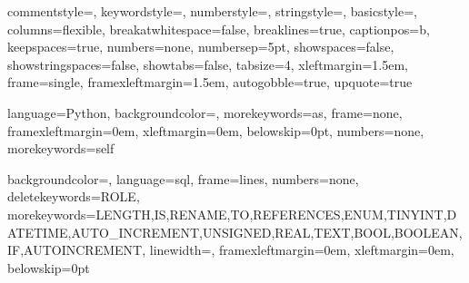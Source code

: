 { %
	commentstyle=\color{Blue},
	keywordstyle=\color{Green},
	numberstyle=\tiny\color{Gray},
	stringstyle=\color{Fuchsia},
	basicstyle=\ttfamily,
	columns=flexible,
	breakatwhitespace=false,
	breaklines=true,
	captionpos=b,
	keepspaces=true,
	numbers=none,
	numbersep=5pt,
	showspaces=false,
	showstringspaces=false,
	showtabs=false,
	tabsize=4,
	xleftmargin=1.5em,
	frame=single,
	framexleftmargin=1.5em,
	autogobble=true,
	upquote=true %
} %
\lstset{style=BaselineStyle}

{ %
	language=Python,
	backgroundcolor=\color{Goldenrod!5},
	morekeywords={as},
	frame=none,
	framexleftmargin=0em,
	xleftmargin=0em,
	belowskip=0pt,
	numbers=none,
	morekeywords={self}
} %

{ %
	backgroundcolor=\color{BlanchedAlmond!20},
	language=sql,
	frame=lines,
	numbers=none,
	deletekeywords={ROLE},
	morekeywords={LENGTH,IS,RENAME,TO,REFERENCES,ENUM,TINYINT,DATETIME,AUTO_INCREMENT,UNSIGNED,REAL,TEXT,BOOL,BOOLEAN, IF,AUTOINCREMENT},
	linewidth=\linewidth,
	framexleftmargin=0em,
	xleftmargin=0em,
	belowskip=0pt
} %





